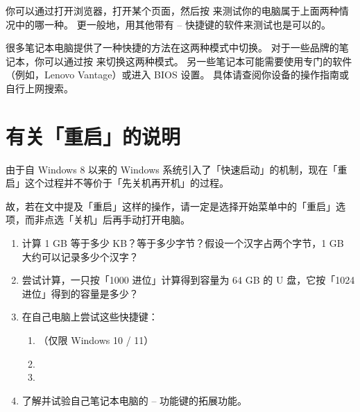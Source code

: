 你可以通过打开浏览器，打开某个页面，然后按  来测试你的电脑属于上面两种情况中的哪一种。
更一般地，用其他带有  --  快捷键的软件来测试也是可以的。

很多笔记本电脑提供了一种快捷的方法在这两种模式中切换。
对于一些品牌的笔记本，你可以通过按  来切换这两种模式。
另一些笔记本可能需要使用专门的软件（例如，Lenovo Vantage）或进入 BIOS 设置。
具体请查阅你设备的操作指南或自行上网搜索。

\section{有关「重启」的说明}

由于自 Windows 8 以来的 Windows 系统引入了「快速启动」的机制，现在「重启」这个过程并不等价于「先关机再开机」的过程。

故，若在文中提及「重启」这样的操作，请一定是选择开始菜单中的「重启」选项，而非点选「关机」后再手动打开电脑。

\practice

\begin{enumerate}
  \item 计算 1 GB 等于多少 KB？等于多少字节？假设一个汉字占两个字节，1 GB 大约可以记录多少个汉字？
  \item 尝试计算，一只按「1000 进位」计算得到容量为 64 GB 的 U 盘，它按「1024 进位」得到的容量是多少？
  \item 在自己电脑上尝试这些快捷键：
    \begin{enumerate}
      \item {} （仅限 Windows 10 / 11）
      \item {}
      \item {}
    \end{enumerate}
  \item 了解并试验自己笔记本电脑的  --  功能键的拓展功能。
\end{enumerate}
